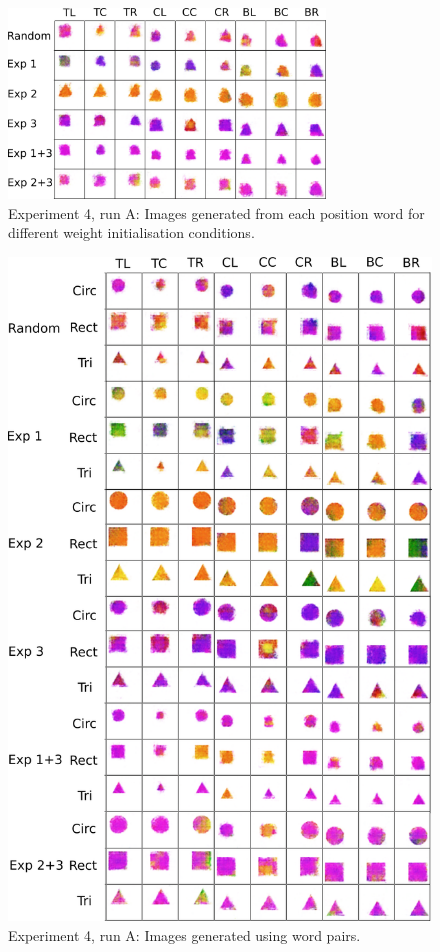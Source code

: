\begin{figure}
\centering
\includegraphics[width=0.75\textwidth]{Figs/shapes/singlelabel739_pos.png}
\caption{Experiment 4, run A: Images generated from each position word for different weight initialisation conditions.}
\label{fig:739single_pos}
\end{figure}



\begin{figure}
\centering
\includegraphics[width=\textwidth]{Figs/shapes/2word739_pos.png}
\caption{Experiment 4, run A: Images generated using word pairs.}
\label{fig:2word739}
\end{figure}



